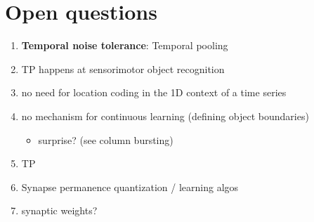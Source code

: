 \documentclass[a4paper,10pt]{article}
\begin{document}
\section{Open questions}
\begin{enumerate}
  \item \textbf{Temporal noise tolerance}: Temporal pooling
  \item TP happens at sensorimotor object recognition
  \item no need for location coding in the 1D context of a time series
  \item no mechanism for continuous learning (defining object boundaries)
      \begin{itemize}
        \item surprise? (see column bursting)
      \end{itemize}
  \item TP
  \item Synapse permanence quantization / learning algos
  \item synaptic weights?
\end{enumerate}
\end{document}

